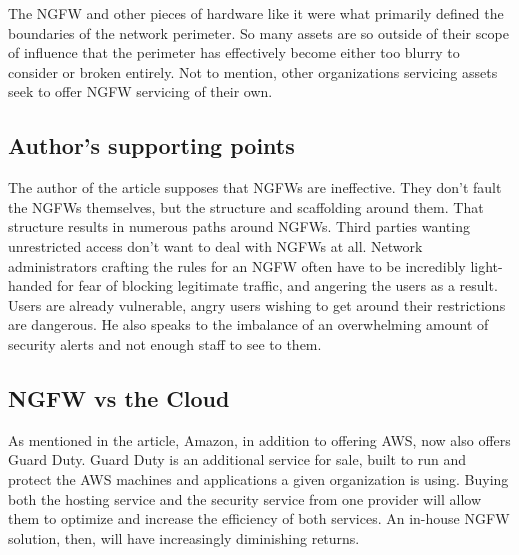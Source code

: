 \documentclass{article}
\begin{document}
The NGFW and other pieces of hardware like it were what primarily defined the
boundaries of the network perimeter. So many assets are so outside of their
scope of influence that the perimeter has effectively become either too blurry
to consider or broken entirely. Not to mention, other organizations servicing
assets seek to offer NGFW servicing of their own.


\subsection{Author's supporting points}

The author of the article supposes that NGFWs are ineffective. They don't fault
the NGFWs themselves, but the structure and scaffolding around them. That
structure results in numerous paths around NGFWs. Third parties wanting
unrestricted access don't want to deal with NGFWs at all. Network
administrators crafting the rules for an NGFW often have to be incredibly
light-handed for fear of blocking legitimate traffic, and angering the users as
a result. Users are already vulnerable, angry users wishing to get around their
restrictions are dangerous. He also speaks to the imbalance of an overwhelming
amount of security alerts and not enough staff to see to them.

\subsection{NGFW vs the Cloud}

As mentioned in the article, Amazon, in addition to offering AWS, now also
offers Guard Duty. Guard Duty is an additional service for sale, built to run
and protect the AWS machines and applications a given organization is using.
Buying both the hosting service and the security service from one provider will
allow them to optimize and increase the efficiency of both services. An
in-house NGFW solution, then, will have increasingly diminishing returns.
\end{document}
